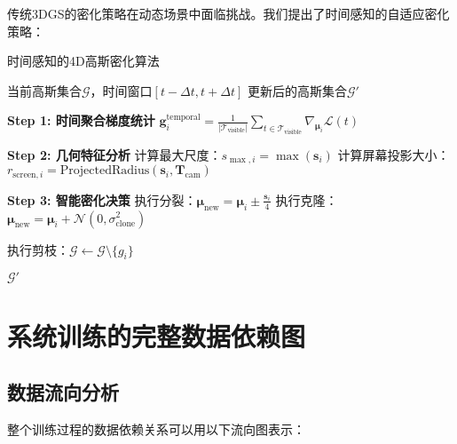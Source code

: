 传统3DGS的密化策略在动态场景中面临挑战。我们提出了时间感知的自适应密化策略：

\begin{algorithm}
\caption{时间感知的4D高斯密化算法}
\label{alg:temporal_aware_densification}
\begin{algorithmic}[1]
\REQUIRE 当前高斯集合$\mathcal{G}$，时间窗口$[t-\Delta t, t+\Delta t]$
\ENSURE 更新后的高斯集合$\mathcal{G}'$

\STATE \textbf{Step 1: 时间聚合梯度统计}
    \STATE $\mathbf{g}_i^{\text{temporal}} = \frac{1}{|\mathcal{T}_{\text{visible}}|} \sum_{t \in \mathcal{T}_{\text{visible}}} \nabla_{\boldsymbol{\mu}_i} \mathcal{L}(t)$
\ENDFOR

\STATE \textbf{Step 2: 几何特征分析}
    \STATE 计算最大尺度：$s_{\max,i} = \max(\mathbf{s}_i)$
    \STATE 计算屏幕投影大小：$r_{\text{screen},i} = \text{ProjectedRadius}(\mathbf{s}_i, \mathbf{T}_{\text{cam}})$
\ENDFOR

\STATE \textbf{Step 3: 智能密化决策}
            \STATE 执行分裂：$\boldsymbol{\mu}_{\text{new}} = \boldsymbol{\mu}_i \pm \frac{\mathbf{s}_i}{4}$
        \ELSE
            \STATE 执行克隆：$\boldsymbol{\mu}_{\text{new}} = \boldsymbol{\mu}_i + \mathcal{N}(0, \sigma_{\text{clone}}^2)$
        \ENDIF
    \ENDIF
    
        \STATE 执行剪枝：$\mathcal{G} \leftarrow \mathcal{G} \setminus \{g_i\}$
    \ENDIF
\ENDFOR

\RETURN $\mathcal{G}'$
\end{algorithmic}
\end{algorithm}

\section{系统训练的完整数据依赖图}

\subsection{数据流向分析}

整个训练过程的数据依赖关系可以用以下流向图表示：

